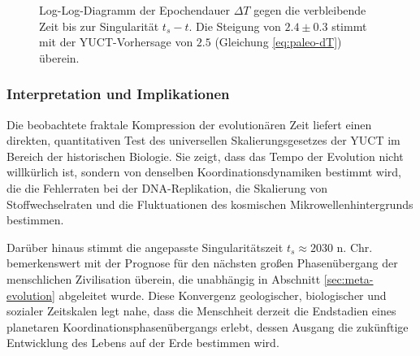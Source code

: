 \documentclass[12pt,a4paper]{article}
\theoremstyle{remark}
\begin{document}
	\begin{figure}[htbp]
		\centering
		\caption{Log-Log-Diagramm der Epochendauer $\Delta T$ gegen die verbleibende Zeit bis zur Singularität $t_s - t$. Die Steigung von $2.4 \pm 0.3$ stimmt mit der YUCT-Vorhersage von $2.5$ (Gleichung \eqref{eq:paleo-dT}) überein.}
		\label{fig:paleo-scaling}
	\end{figure}
	
	\subsubsection{Interpretation und Implikationen}
	
	Die beobachtete fraktale Kompression der evolutionären Zeit liefert einen direkten, quantitativen Test des universellen Skalierungsgesetzes der YUCT im Bereich der historischen Biologie. Sie zeigt, dass das Tempo der Evolution nicht willkürlich ist, sondern von denselben Koordinationsdynamiken bestimmt wird, die die Fehlerraten bei der DNA-Replikation, die Skalierung von Stoffwechselraten und die Fluktuationen des kosmischen Mikrowellenhintergrunds bestimmen.
	
	Darüber hinaus stimmt die angepasste Singularitätszeit $t_s \approx 2030$ n. Chr. bemerkenswert mit der Prognose für den nächsten großen Phasenübergang der menschlichen Zivilisation überein, die unabhängig in Abschnitt \ref{sec:meta-evolution} abgeleitet wurde. Diese Konvergenz geologischer, biologischer und sozialer Zeitskalen legt nahe, dass die Menschheit derzeit die Endstadien eines planetaren Koordinationsphasenübergangs erlebt, dessen Ausgang die zukünftige Entwicklung des Lebens auf der Erde bestimmen wird.
	
\end{document}
